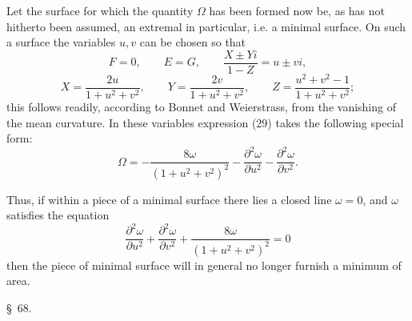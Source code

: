 \documentclass[11pt,a4paper,leqno]{article}
\begin{document}
Let the surface for which the quantity $\Omega$ has been formed now be,
as has not hitherto been assumed, an extremal in particular, i.e. a minimal
surface. On such a surface the variables $u,v$ can be chosen so that
\[
F=0,\qquad E=G,\qquad \frac{X\pm Yi}{1-Z}=u\pm vi,
\]
\[
X=\frac{2u}{1+u^2+v^2},\qquad
Y=\frac{2v}{1+u^2+v^2},\qquad
Z=\frac{u^2+v^2-1}{1+u^2+v^2};
\]
this follows readily, according to Bonnet and Weierstrass, from the
vanishing of the mean curvature. In these variables expression (29) takes
the following special form:
\[
\Omega=-\frac{8\omega}{(1+u^2+v^2)^2}
-\frac{\partial^2\omega}{\partial u^2}
-\frac{\partial^2\omega}{\partial v^2}.
\]

Thus, if within a piece of a minimal surface there lies a closed line
$\omega=0$, and $\omega$ satisfies the equation
\[
\frac{\partial^2\omega}{\partial u^2}
+\frac{\partial^2\omega}{\partial v^2}
+\frac{8\omega}{(1+u^2+v^2)^2}=0
\]
then the piece of minimal surface will in general no longer furnish a
minimum of area.


\begin{center}
{\large \S~68.}
\end{center}
\end{document}
